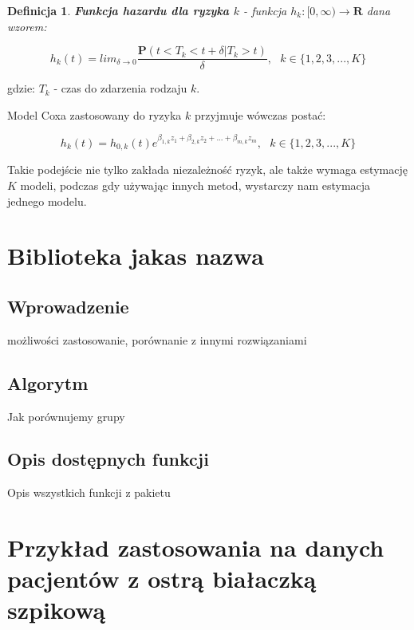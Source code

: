 \documentclass[]{pracamgr}
\newtheorem{defi}{Definicja}[section]
\begin{document}
\begin{defi}\label{hazard_k}
\textbf{Funkcja hazardu dla ryzyka $k$} - funkcja $h_k:[0,\infty) \to \mathbf{R}$ dana wzorem:

$$h_k(t)= lim_{\delta \to 0} \frac{\mathbf{P}(t<T_k<t+\delta|T_k>t)}{\delta}, \ \ \ k \in \{1,2,3,...,K\} $$

\end{defi}
gdzie: $T_k$ - czas do zdarzenia rodzaju $k$.

Model Coxa zastosowany do ryzyka $k$ przyjmuje wówczas postać:

\begin{equation}
h_k(t) = h_{0,k}(t) e^{\beta_{1,k}z_1 + \beta_{2,k}z_2 +...+ \beta_{m,k}z_m}, \ \ \ k \in \{1,2,3,...,K\}
\end{equation}






Takie podejście nie tylko zakłada niezależność ryzyk, ale także wymaga estymację $K$ modeli, podczas gdy używając innych metod, wystarczy nam estymacja jednego modelu.

\chapter{Biblioteka jakas nazwa}\label{r:losers}

\section{Wprowadzenie}

możliwości zastosowanie, porównanie z innymi rozwiązaniami

\section{Algorytm}

Jak porównujemy grupy

\section{Opis dostępnych funkcji}

Opis wszystkich funkcji z pakietu

\chapter{Przykład zastosowania na danych pacjentów z ostrą białaczką szpikową}\label{r:fifak}
\end{document}

